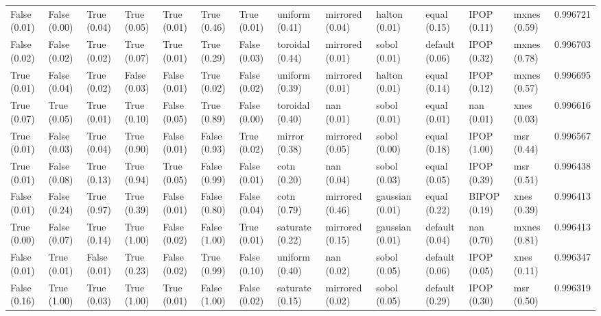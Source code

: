 \begin{tabular}{lllllllllllllr}
False (0.01) & False (0.00) & True (0.04) & True (0.05) & True (0.01) & True (0.46) & True (0.01) & uniform (0.41) & mirrored (0.04) & halton (0.01) & equal (0.15) & IPOP (0.11) & mxnes (0.59) & 0.996721 \\
False (0.02) & False (0.02) & True (0.02) & True (0.07) & True (0.01) & True (0.29) & False (0.03) & toroidal (0.44) & mirrored (0.01) & sobol (0.01) & default (0.06) & IPOP (0.32) & mxnes (0.78) & 0.996703 \\
True (0.01) & False (0.04) & True (0.02) & False (0.03) & False (0.01) & True (0.02) & False (0.02) & uniform (0.39) & mirrored (0.01) & halton (0.01) & equal (0.14) & IPOP (0.12) & mxnes (0.57) & 0.996695 \\
True (0.07) & True (0.05) & True (0.01) & True (0.10) & False (0.05) & True (0.89) & False (0.00) & toroidal (0.40) & nan (0.01) & sobol (0.01) & equal (0.01) & nan (0.01) & xnes (0.03) & 0.996616 \\
True (0.01) & False (0.03) & True (0.04) & True (0.90) & False (0.01) & False (0.93) & True (0.02) & mirror (0.38) & mirrored (0.05) & sobol (0.00) & equal (0.18) & IPOP (1.00) & msr (0.44) & 0.996567 \\
True (0.01) & False (0.08) & True (0.13) & True (0.94) & True (0.05) & False (0.99) & False (0.01) & cotn (0.20) & nan (0.04) & sobol (0.03) & equal (0.05) & IPOP (0.39) & msr (0.51) & 0.996438 \\
False (0.01) & False (0.24) & True (0.97) & True (0.39) & False (0.01) & False (0.80) & False (0.04) & cotn (0.79) & mirrored (0.46) & gaussian (0.01) & equal (0.22) & BIPOP (0.19) & xnes (0.39) & 0.996413 \\
True (0.00) & False (0.07) & True (0.14) & True (1.00) & False (0.02) & False (1.00) & True (0.01) & saturate (0.22) & mirrored (0.15) & gaussian (0.01) & default (0.04) & nan (0.70) & mxnes (0.81) & 0.996413 \\
False (0.01) & True (0.01) & False (0.01) & True (0.23) & False (0.02) & True (0.99) & False (0.10) & uniform (0.40) & nan (0.02) & sobol (0.05) & default (0.06) & IPOP (0.05) & xnes (0.11) & 0.996347 \\
False (0.16) & True (1.00) & True (0.03) & True (1.00) & True (0.01) & False (1.00) & False (0.02) & saturate (0.15) & mirrored (0.02) & sobol (0.05) & default (0.29) & IPOP (0.30) & msr (0.50) & 0.996319 \\
\bottomrule
\end{tabular}
